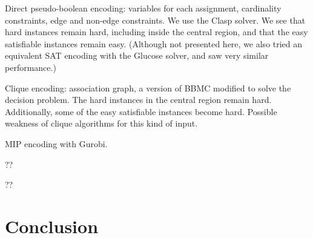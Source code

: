 \documentclass[letterpaper]{article}
\begin{document}
Direct pseudo-boolean encoding: variables for each assignment, cardinality constraints, edge and
non-edge constraints. We use the Clasp solver. We see that hard instances remain hard, including
inside the central region, and that the easy satisfiable instances remain easy. (Although not
presented here, we also tried an equivalent SAT encoding with the Glucose solver, and saw very
similar performance.)

Clique encoding: association graph, a version of BBMC modified to solve the decision problem. The
hard instances in the central region remain hard. Additionally, some of the easy satisfiable
instances become hard. Possible weakness of clique algorithms for this kind of input.

MIP encoding with Gurobi.

?? \citep{Anton:2009}

?? \citep{Lipets:2009}

\section{Conclusion}

\lipsum[12]



\end{document}
